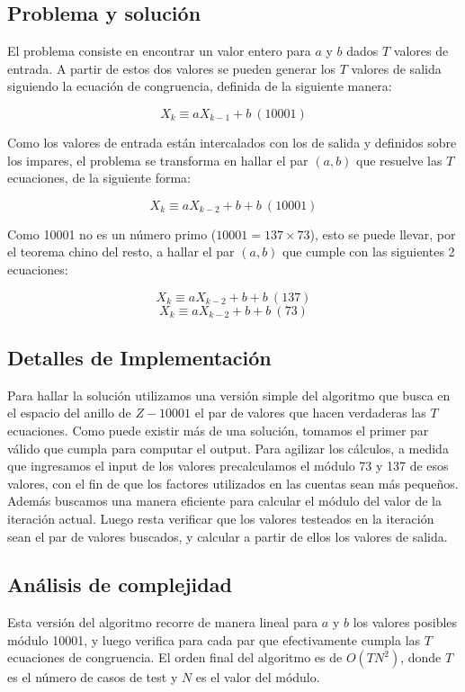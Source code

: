 \subsection*{Problema y solución}

El problema consiste en encontrar un valor entero para $a$ y $b$ dados $T$
valores de entrada. A partir de estos dos valores se pueden generar los $T$
valores de salida siguiendo la ecuación de congruencia, definida de la
siguiente manera:

$$X_k \equiv aX_{k-1} + b\ (10001)$$

Como los valores de entrada están intercalados con los de salida y definidos
sobre los impares, el problema se transforma en hallar el par $(a,b)$ que
resuelve las $T$ ecuaciones, de la siguiente forma:

$$X_k \equiv aX_{k-2} + b + b\ (10001)$$

Como 10001 no es un número primo ($10001 = 137\times 73$), esto se puede
llevar, por el teorema chino del resto, a hallar el par $(a,b)$ que cumple con
las siguientes 2 ecuaciones:

$$X_k \equiv aX_{k-2} + b + b\ (137)$$
$$X_k \equiv aX_{k-2} + b + b\ (73)$$


\subsection*{Detalles de Implementación}

Para hallar la solución utilizamos una versión simple del algoritmo que busca
en el espacio del anillo de $Z-10001$ el par de valores que hacen verdaderas
las $T$ ecuaciones. Como puede existir más de una solución, tomamos el primer
par válido que cumpla para computar el output. Para agilizar los cálculos, a
medida que ingresamos el input de los valores precalculamos el módulo 73 y 137
de esos valores, con el fin de que los factores utilizados en las cuentas sean
más pequeños. Además buscamos una manera eficiente para
calcular el módulo del valor de la iteración actual. Luego resta verificar que
los valores testeados en la iteración sean el par de valores buscados, y
calcular a partir de ellos los valores de salida.


\subsection*{Análisis de complejidad}

Esta versión del algoritmo recorre de manera lineal para $a$ y $b$ los valores
posibles módulo 10001, y luego verifica para cada par que efectivamente cumpla
las $T$ ecuaciones de congruencia. El orden final del algoritmo es de
$O(TN^2)$, donde $T$ es el número de casos de test y $N$ es el valor del módulo.
